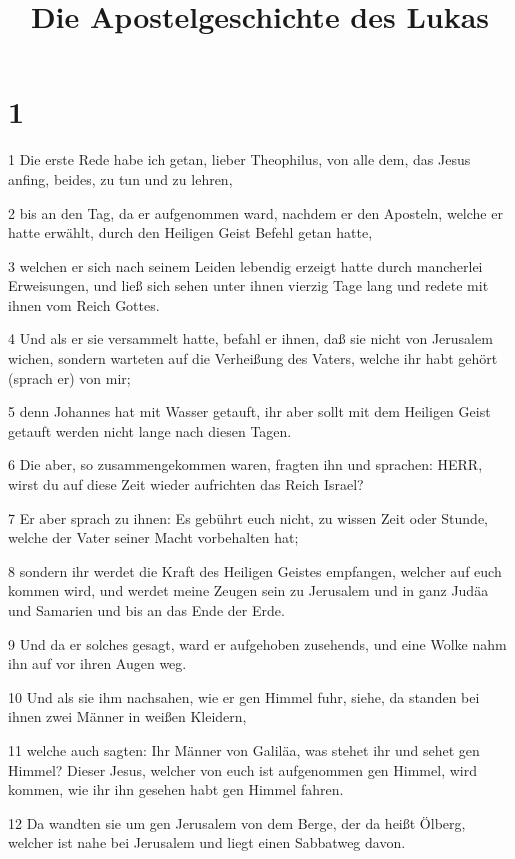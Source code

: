 

\title{Die Apostelgeschichte des Lukas}


\chapter{1}

\par 1 Die erste Rede habe ich getan, lieber Theophilus, von alle dem, das Jesus anfing, beides, zu tun und zu lehren,
\par 2 bis an den Tag, da er aufgenommen ward, nachdem er den Aposteln, welche er hatte erwählt, durch den Heiligen Geist Befehl getan hatte,
\par 3 welchen er sich nach seinem Leiden lebendig erzeigt hatte durch mancherlei Erweisungen, und ließ sich sehen unter ihnen vierzig Tage lang und redete mit ihnen vom Reich Gottes.
\par 4 Und als er sie versammelt hatte, befahl er ihnen, daß sie nicht von Jerusalem wichen, sondern warteten auf die Verheißung des Vaters, welche ihr habt gehört (sprach er) von mir;
\par 5 denn Johannes hat mit Wasser getauft, ihr aber sollt mit dem Heiligen Geist getauft werden nicht lange nach diesen Tagen.
\par 6 Die aber, so zusammengekommen waren, fragten ihn und sprachen: HERR, wirst du auf diese Zeit wieder aufrichten das Reich Israel?
\par 7 Er aber sprach zu ihnen: Es gebührt euch nicht, zu wissen Zeit oder Stunde, welche der Vater seiner Macht vorbehalten hat;
\par 8 sondern ihr werdet die Kraft des Heiligen Geistes empfangen, welcher auf euch kommen wird, und werdet meine Zeugen sein zu Jerusalem und in ganz Judäa und Samarien und bis an das Ende der Erde.
\par 9 Und da er solches gesagt, ward er aufgehoben zusehends, und eine Wolke nahm ihn auf vor ihren Augen weg.
\par 10 Und als sie ihm nachsahen, wie er gen Himmel fuhr, siehe, da standen bei ihnen zwei Männer in weißen Kleidern,
\par 11 welche auch sagten: Ihr Männer von Galiläa, was stehet ihr und sehet gen Himmel? Dieser Jesus, welcher von euch ist aufgenommen gen Himmel, wird kommen, wie ihr ihn gesehen habt gen Himmel fahren.
\par 12 Da wandten sie um gen Jerusalem von dem Berge, der da heißt Ölberg, welcher ist nahe bei Jerusalem und liegt einen Sabbatweg davon.
